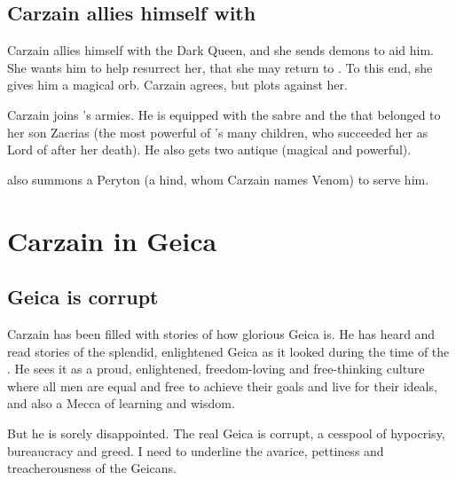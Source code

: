 \subsection{Carzain allies himself with \Belzir} 
Carzain allies himself with the Dark Queen, and she sends demons to aid him. 
She wants him to help resurrect her, that she may return to \Miith{}. 
To this end, she gives him a magical orb. 
Carzain agrees, but plots against her. 

Carzain joins \Belzir's armies. 
He is equipped with the sabre and the  that belonged to her son Zacrias (the most powerful of \Belzir's many children, who succeeded her as Lord of \ClanGeican after her death). 
He also gets two antique  (magical and powerful). 

\Belzir{} also summons a Peryton (a hind, whom Carzain names Venom) to serve him. 
















\section{Carzain in Geica}
\subsection{Geica is corrupt}
Carzain has been filled with stories of how glorious Geica is. He has heard and read stories of the splendid, enlightened Geica as it looked during the time of the . He sees it as a proud, enlightened, freedom-loving and free-thinking culture where all men are equal and free to achieve their goals and live for their ideals, and also a Mecca of learning and wisdom. 

But he is sorely disappointed. The real Geica is corrupt, a cesspool of hypocrisy, bureaucracy and greed. I need to underline the avarice, pettiness and treacherousness of the Geicans. 

